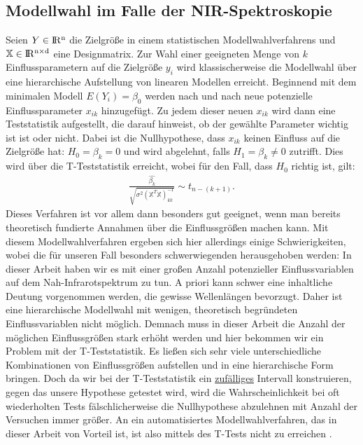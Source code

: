 	\subsection{Modellwahl im Falle der NIR-Spektroskopie}
	\label{ssec:mlr}
	Seien $Y\in \rm I\!R^{n}$ die Zielgröße in einem statistischen Modellwahlverfahrens und $\mathbb{X} \in \rm I\!R^{n \times d}$ eine Designmatrix.
	Zur Wahl einer geeigneten Menge von $k$ Einflussparametern auf die Zielgröße $y_i$  wird klassischerweise die Modellwahl über eine hierarchische Aufstellung von linearen Modellen erreicht. Beginnend mit dem minimalen Modell $E(Y_i) = \beta_0$ werden nach und nach neue potenzielle Einflussparameter $x_{ik}$ hinzugefügt. Zu jedem dieser neuen $x_{ik}$ wird dann eine Teststatistik aufgestellt, die darauf hinweist, ob der gewählte Parameter wichtig ist ist oder nicht. Dabei ist die Nullhypothese, dass $x_{ik}$ keinen Einfluss auf die Zielgröße hat: $ H_0 = \beta_k = 0$ und wird abgelehnt, falls $H_1 = \beta_k \neq 0$ zutrifft. 
	Dies wird über die T-Teststatistik erreicht,  wobei für den Fall, dass $H_0$ richtig ist, gilt: 
	\begin{align}
	\frac{\hat{\beta_k}}{\sqrt{\sigma^2(\mathbb{X}^T\mathbb{X})^{-1}_{kk}}} \sim t_{n-(k+1)}.
	\end{align}
	Dieses Verfahren ist vor allem dann besonders gut geeignet, wenn man bereits theoretisch fundierte Annahmen über die Einflussgrößen machen kann.
	Mit diesem Modellwahlverfahren ergeben sich hier allerdings einige Schwierigkeiten, wobei die für unseren Fall besonders schwerwiegenden herausgehoben werden: In dieser Arbeit haben wir es mit einer großen Anzahl potenzieller Einflussvariablen auf dem Nah-Infrarotspektrum zu tun. A priori kann schwer eine inhaltliche Deutung vorgenommen werden, die gewisse Wellenlängen bevorzugt. Daher ist eine hierarchische Modellwahl mit wenigen, theoretisch begründeten Einflussvariablen nicht möglich. Demnach muss in dieser Arbeit die Anzahl der möglichen Einflussgrößen stark erhöht werden und hier bekommen wir ein Problem mit der T-Teststatistik. Es ließen sich sehr viele unterschiedliche Kombinationen von Einflussgrößen aufstellen und in eine hierarchische Form bringen. Doch da wir bei der T-Teststatistik ein \underline{zufälliges} Intervall konstruieren, gegen das unsere Hypothese getestet wird, wird die Wahrscheinlichkeit bei oft wiederholten Tests fälschlicherweise die Nullhypothese abzulehnen mit Anzahl der Versuchen immer größer. An ein automatisiertes Modellwahlverfahren, das in dieser Arbeit von Vorteil ist, ist also mittels des T-Tests nicht zu erreichen \cite{Schumacher.2019}.
